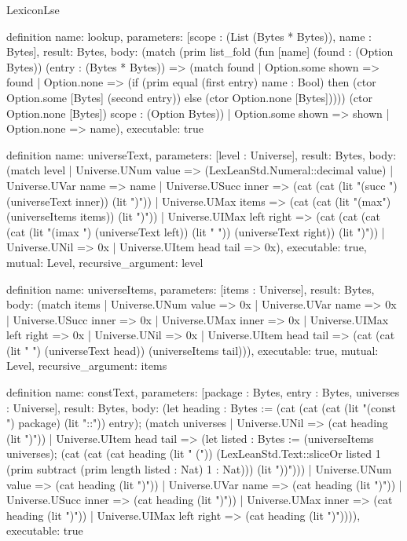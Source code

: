 \begin{lexlean}{LexiconLse}
\begin{semanticmodule}
definition{
  name: lookup,
  parameters: [scope : (List (Bytes * Bytes)), name : Bytes],
  result: Bytes,
  body: (match (prim list_fold (fun [name] (found : (Option Bytes)) (entry : (Bytes * Bytes)) => (match found
      | Option.some shown => found
      | Option.none => (if (prim equal (first entry) name : Bool) then (ctor Option.some [Bytes] (second entry)) else (ctor Option.none [Bytes])))) (ctor Option.none [Bytes]) scope : (Option Bytes))
    | Option.some shown => shown
    | Option.none => name),
  executable: true
}

definition{
  name: universeText,
  parameters: [level : Universe],
  result: Bytes,
  body: (match level
    | Universe.UNum value => (LexLeanStd.Numeral::decimal value)
    | Universe.UVar name => name
    | Universe.USucc inner => (cat (cat (lit "(succ ") (universeText inner)) (lit ")"))
    | Universe.UMax items => (cat (cat (lit "(max") (universeItems items)) (lit ")"))
    | Universe.UIMax left right => (cat (cat (cat (cat (lit "(imax ") (universeText left)) (lit " ")) (universeText right)) (lit ")"))
    | Universe.UNil => 0x
    | Universe.UItem head tail => 0x),
  executable: true,
  mutual: Level,
  recursive_argument: level
}

definition{
  name: universeItems,
  parameters: [items : Universe],
  result: Bytes,
  body: (match items
    | Universe.UNum value => 0x
    | Universe.UVar name => 0x
    | Universe.USucc inner => 0x
    | Universe.UMax inner => 0x
    | Universe.UIMax left right => 0x
    | Universe.UNil => 0x
    | Universe.UItem head tail => (cat (cat (lit " ") (universeText head)) (universeItems tail))),
  executable: true,
  mutual: Level,
  recursive_argument: items
}

definition{
  name: constText,
  parameters: [package : Bytes, entry : Bytes, universes : Universe],
  result: Bytes,
  body: (let heading : Bytes := (cat (cat (cat (lit "(const ") package) (lit "::")) entry); (match universes
    | Universe.UNil => (cat heading (lit ")"))
    | Universe.UItem head tail => (let listed : Bytes := (universeItems universes); (cat (cat (cat heading (lit " (")) (LexLeanStd.Text::sliceOr listed 1 (prim subtract (prim length listed : Nat) 1 : Nat))) (lit "))")))
    | Universe.UNum value => (cat heading (lit ")"))
    | Universe.UVar name => (cat heading (lit ")"))
    | Universe.USucc inner => (cat heading (lit ")"))
    | Universe.UMax inner => (cat heading (lit ")"))
    | Universe.UIMax left right => (cat heading (lit ")")))),
  executable: true
}


\end{semanticmodule}
\end{lexlean}
